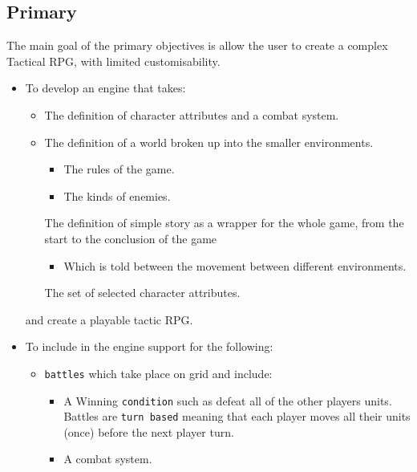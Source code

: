 \subsection{Primary}
\label{primary}
The main goal of the primary objectives is allow the user to create a complex Tactical RPG, with limited customisability.  
\begin{itemize}
\item To develop an engine that takes:
\begin{itemize}

 \item The definition of character attributes and a combat system.
	\item The definition of a world broken up into the smaller environments.
	\begin{itemize}
		\item The rules of the game.
		\item The kinds of enemies.
	\end{itemize}
	
	\tick The definition of simple story as a wrapper for the whole game, from the start to the conclusion of the game
	\begin{itemize}
		\item Which is told between the movement between different environments.
	\end{itemize}
	                        
	\cross The set of selected character attributes.
	
\end{itemize}
and create a playable tactic RPG.

\item To include in the engine support for the following:
\begin{itemize}
	\tick \texttt{units} with a fixed set of associated attributes such as:
	\begin{itemize}
		\tick Hit-points (which represent the health of the unit).
		\tick Strength.
		\tick Defence.
		\tick Move (The number of tiles the unit can move each turn).
	\end{itemize}
	
	\item \texttt{battles} which take place on grid and include:
	\begin{itemize}
		\tick A set number of \texttt{units} for each player.
		\item A Winning \texttt{condition} such as defeat all of the other players units.
		\tick Battles are \texttt{turn based} meaning that each player moves all their units (once) before the next player turn.   
		\item A combat system.
	\end{itemize}
	

\end{itemize}
\end{itemize}
